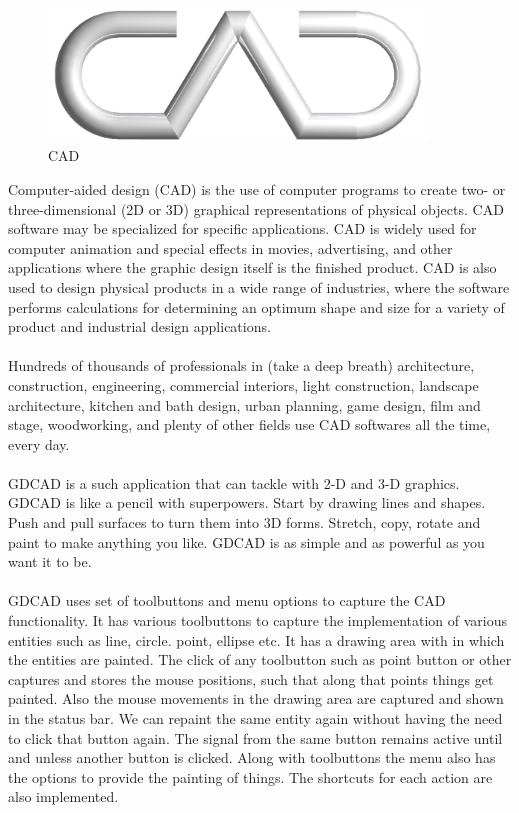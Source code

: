 \begin{figure}[h!]
\centering
\includegraphics[width=0.9\textwidth]{images/cad1.png}
\caption{CAD}
\end{figure}
\hspace{-1.6em} Computer-aided design (CAD) is the use of computer programs to create two- or three-dimensional (2D or 3D) graphical representations of physical objects. CAD software may be specialized for specific applications. CAD is widely used for computer animation and special effects in movies, advertising, and other applications where the graphic design itself is the finished product. CAD is also used to design physical products in a wide range of industries, where the software performs calculations for determining an optimum shape and size for a variety of product and industrial design applications.\\\\
Hundreds of thousands of professionals in (take a deep breath) architecture, construction, engineering, commercial interiors, light construction, landscape architecture, kitchen and bath design, urban planning, game design, film and stage, woodworking, and plenty of other fields use CAD softwares all the time, every day.\\\\
GDCAD is a such application that can tackle with 2-D and 3-D graphics. GDCAD is like a pencil with superpowers. Start by drawing lines and shapes. Push and pull surfaces to turn them into 3D forms. Stretch, copy, rotate and paint to make anything you like. GDCAD is as simple and as powerful as you want it to be.\\\\
GDCAD uses set of toolbuttons and menu options to capture the CAD functionality. It has various toolbuttons to capture the implementation of various entities such as line, circle. point, ellipse etc. It has a drawing area with in which the entities are painted. The click of any toolbutton such as point button or other captures and stores the mouse positions, such that along that points things get painted. Also the mouse movements in the drawing area are captured and shown in the status bar. We can repaint the same entity again without having the need to click that button again. The signal from the same button remains active until and unless another button is clicked. Along with toolbuttons the menu also has the options to provide the painting of things. The shortcuts for each action are also implemented.\\\\
